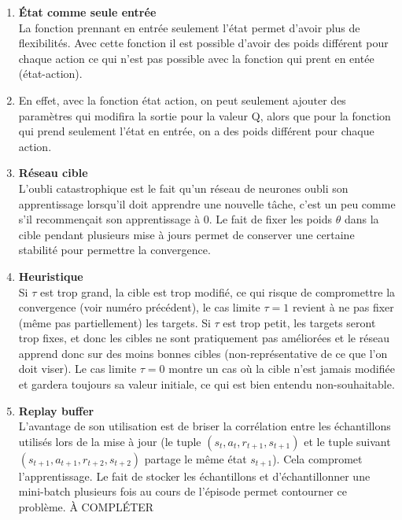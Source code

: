 \documentclass[letterpaper,11pt]{article}
\begin{document}
\begin{enumerate}[label=(\alph*)]

\item \textbf{État comme seule entrée}\\
La fonction prennant en entrée seulement l'état permet d'avoir plus de flexibilités.
Avec cette fonction il est possible d'avoir des poids différent pour chaque action ce qui n'est pas possible avec la fonction qui prent en entée (état-action).
\item En effet, avec la fonction état action, on peut seulement ajouter des paramètres qui modifira la sortie pour la valeur Q, alors que pour la fonction qui prend seulement l'état en entrée, on a des poids différent pour chaque action.

\item \textbf{Réseau cible}\\
L'oubli catastrophique est le fait qu'un réseau de neurones oubli son apprentissage lorsqu'il doit apprendre une nouvelle tâche, c'est un peu comme s'il recommençait son apprentissage à 0. Le fait de fixer les poids $\theta$ dans la cible pendant plusieurs mise à jours permet de conserver une certaine stabilité pour permettre la convergence.

\item \textbf{Heuristique}\\
Si $\tau$ est trop grand, la cible est trop modifié, ce qui risque de compromettre la convergence (voir numéro précédent), le cas limite $\tau=1$ revient à ne pas fixer (même pas partiellement) les targets. Si $\tau$ est trop petit, les targets seront trop fixes, et donc les cibles ne sont pratiquement pas améliorées et le réseau apprend donc sur des moins bonnes cibles (non-représentative de ce que l'on doit viser). Le cas limite $\tau=0$ montre un cas où la cible n'est jamais modifiée et gardera toujours sa valeur initiale, ce qui est bien entendu non-souhaitable. 

\item \textbf{Replay buffer}\\
L'avantage de son utilisation est de briser la corrélation entre les échantillons utilisés lors de la mise à jour (le tuple $(s_t, a_t, r_{t+1}, s_{t+1})$ et le tuple suivant $(s_{t+1}, a_{t+1}, r_{t+2}, s_{t+2})$ partage le même état $s_{t+1}$). Cela compromet l'apprentissage. Le fait de stocker les échantillons et d'échantillonner une mini-batch plusieurs fois au cours de l'épisode permet contourner ce problème. À COMPLÉTER  


\end{enumerate}
\end{document}
